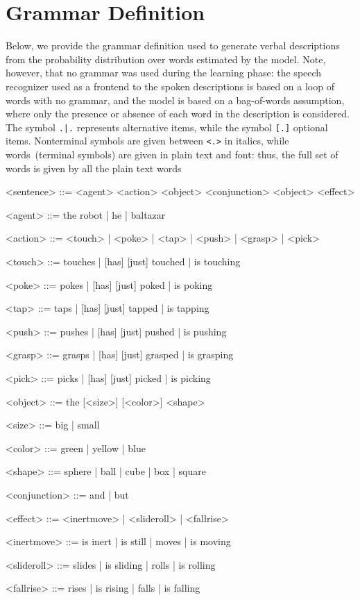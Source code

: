 
\section{Grammar Definition}
Below, we provide the grammar definition used to generate verbal descriptions from the probability distribution over words estimated by the model.
Note, however, that no grammar was used during the learning phase: the speech recognizer used as a frontend to the spoken descriptions is based on a loop of words with no grammar, and the \affwords{} model is based on a bag-of-words assumption, where only the presence or absence of each word in the description is considered.
The symbol \texttt{.|.} represents alternative items, while the symbol \texttt{[.]} optional items.
Nonterminal symbols are given between \texttt{<.>} in italics, while words~(terminal symbols) are given in plain text and font: thus, the full set of words is given by all the plain text words

\begin{grammar}
  <sentence> ::= <agent> <action> <object> <conjunction> <object> <effect>

  <agent> ::= the robot | he | baltazar

  <action> ::= <touch> | <poke> | <tap> | <push> | <grasp> | <pick>

  <touch> ::= touches | [has] [just] touched | is touching

  <poke> ::= pokes | [has] [just] poked | is poking

  <tap> ::= taps | [has] [just] tapped | is tapping

  <push> ::= pushes | [has] [just] pushed | is pushing

  <grasp> ::= grasps | [has] [just] grasped | is grasping

  <pick> ::= picks | [has] [just] picked | is picking

  <object> ::= the [<size>] [<color>] <shape>

  <size> ::= big | small

  <color> ::= green | yellow | blue

  <shape> ::= sphere | ball | cube | box | square

  <conjunction> ::= and | but

  <effect> ::= <inertmove> | <slideroll> | <fallrise>

  <inertmove> ::= is inert | is still | moves | is moving

  <slideroll> ::= slides | is sliding | rolls | is rolling

  <fallrise> ::= rises | is rising | falls | is falling
\end{grammar}
